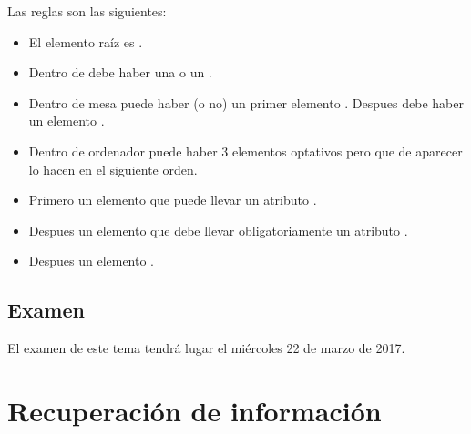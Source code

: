 \documentclass[letterpaper,10pt,spanish]{sphinxmanual}
\begin{document}
Las reglas son las siguientes:
\begin{itemize}
\item {} 
El elemento raíz es .

\item {} 
Dentro de  debe haber una  o un .

\item {} 
Dentro de mesa puede haber (o no) un primer elemento . Despues debe haber un elemento .

\item {} 
Dentro de ordenador puede haber 3 elementos optativos pero que de aparecer lo hacen en el siguiente orden.

\item {} 
Primero un elemento  que puede llevar un atributo .

\item {} 
Despues un elemento  que debe llevar obligatoriamente un atributo .

\item {} 
Despues un elemento .

\end{itemize}


\section{Examen}
\label{\detokenize{tema5:examen}}
El examen de este tema tendrá lugar el miércoles 22 de marzo de 2017.


\chapter{Recuperación de información}
\label{\detokenize{tema6::doc}}\label{\detokenize{tema6:recuperacion-de-informacion}}
\end{document}
